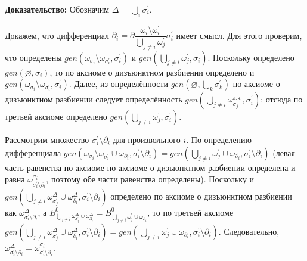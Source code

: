 \newcommand{\sigi}{{\sigma_i}}
\newcommand{\sigpi}{{\sigma^\prime_i}}
\newcommand{\sigpj}{{\sigma^\prime_j}}
\newcommand{\parti}{{\partial_i}}
\newcommand{\alloth}{\bigcup\limits_{j \neq i}\omega^\prime_j}
\newcommand{\rprt}{{\text{п.ч.}}}

\textbf{Доказательство:}
Обозначим $\Delta = \bigcup\limits_i \sigma_i^\prime$.

Докажем, что дифференциал $\partial_i = \partial\dfrac{\omega_i \setminus \omega_i^\prime}{\bigcup\limits_{j \neq i} \omega_j^\prime} \sigma_i^\prime$ имеет смысл. Для этого проверим, что определены $gen(\omega_{\sigi} \setminus \omega_{\sigpi}, \sigpi)$ и $gen(\alloth, \sigpi)$. Поскольку определено $gen(\varnothing, \sigi)$, то по аксиоме о дизъюнктном разбиении определено и $gen(\omega_{\sigi} \setminus \omega_{\sigpi}, \sigpi)$. Далее, из определённости $gen(\varnothing, \bigcup\limits_k \sigma^\prime_k)$ по аксиоме о дизъюнктном разбиении следует определённость $gen(\bigcup\limits_{j \neq i}\omega^{\text{л.ч.}}_\sigpj, \sigpi)$; отсюда по третьей аксиоме определено $gen(\alloth, \sigpi)$.

Рассмотрим множество $\sigpi \setminus \parti$ для произвольного $i$. По определению дифференциала $gen(\omega_\sigi \setminus \omega_\sigpi \cup \omega_\parti, \sigpi\setminus\parti) = gen(\alloth \cup \omega_\parti, \sigpi\setminus\parti)$ (левая часть равенства по аксиоме по аксиоме о дизъюнктном разбиении определена и равна $\omega^\sigi_{\sigpi\setminus\parti}$, поэтому обе части равенства определены). Поскольку и $gen(\bigcup\limits_{j \neq i}\omega^\Delta_\sigpj \cup \omega^\Delta_\parti, \sigpi \setminus \parti)$ определено по аксиоме о дизъюнктном разбиении как $\omega^\Delta_{\sigpi\setminus\parti}$, а $B^0_{\bigcup\limits_{j \neq i}\omega^\Delta_\sigpj \cup \omega^\Delta_\parti} = B^0_{\alloth \cup \omega_\parti}$, то по третьей аксиоме $gen(\bigcup\limits_{j \neq i}\omega^\Delta_\sigpj \cup \omega^\Delta_\parti, \sigpi \setminus \parti) = gen(\alloth \cup \omega_\parti, \sigpi\setminus\parti)$. Следовательно, $\omega^\Delta_{\sigpi\setminus\parti} = \omega^\sigi_{\sigpi\setminus\parti}$.

